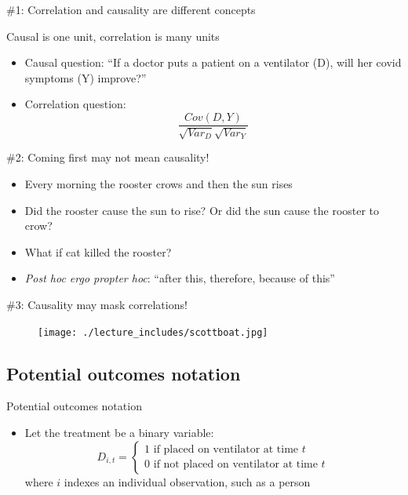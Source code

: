 \documentclass{beamer}
\begin{document}
\begin{frame}{\#1: Correlation and causality are different concepts}

  Causal is one unit, correlation is many units
  \begin{itemize}
    \item Causal question: ``If a doctor puts a patient on a ventilator (D), will her covid symptoms (Y) improve?''
    \item Correlation question:  $$\frac{Cov(D,Y)}{\sqrt{Var_D}\sqrt{{Var_Y}}}$$
  \end{itemize}

\end{frame}


\begin{frame}{\#2: Coming first may not mean causality!}

  \begin{itemize}
    \item Every morning the rooster crows and then the sun rises
    \item Did the rooster cause the sun to rise? Or did the sun cause the rooster to crow?
    \item What if cat killed the rooster?
    \item \emph{Post hoc ergo propter hoc}: ``after this, therefore, because of this''
  \end{itemize}

\end{frame}

\begin{frame}{\#3: Causality may mask correlations!}

  \begin{figure}
    \centering
    \texttt{[image: ./lecture\_includes/scottboat.jpg]}
  \end{figure}

\end{frame}


\subsection{Potential outcomes notation}





\begin{frame}{Potential outcomes notation}

  \begin{itemize}
    \item Let the treatment be a binary variable: $$D_{i,t} =\begin{cases} 1 \text{ if placed on ventilator at time $t$} \\ 0 \text{ if not placed on ventilator at time $t$} \end{cases}$$where $i$ indexes an individual observation, such as a person
  \end{itemize}
\end{frame}
\end{document}
